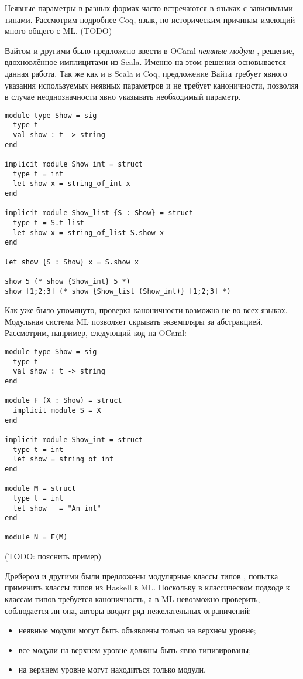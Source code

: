 \documentclass[../diploma.tex]{subfiles}
\begin{document}
Неявные параметры в разных формах часто встречаются в языках с зависимыми типами. Рассмотрим подробнее Coq, язык, по историческим причинам имеющий много общего с ML. (TODO)

Вайтом и другими было предложено ввести в OCaml \textit{неявные модули} \cite{white}, решение, вдохновлённое имплицитами из Scala. Именно на этом решении основывается данная работа. Так же как и в Scala и Coq, предложение Вайта требует явного указания используемых неявных параметров и не требует каноничности, позволяя в случае неоднозначности явно указывать необходимый параметр. 

\begin{verbatim}
module type Show = sig
  type t
  val show : t -> string
end

implicit module Show_int = struct
  type t = int
  let show x = string_of_int x
end

implicit module Show_list {S : Show} = struct
  type t = S.t list
  let show x = string_of_list S.show x
end

let show {S : Show} x = S.show x

show 5 (* show {Show_int} 5 *)
show [1;2;3] (* show {Show_list (Show_int)} [1;2;3] *)
\end{verbatim}

Как уже было упомянуто, проверка каноничности возможна не во всех языках. Модульная система ML позволяет скрывать экземпляры за абстракцией. Рассмотрим, например, следующий код на OCaml:

\begin{verbatim}
module type Show = sig
  type t
  val show : t -> string
end

module F (X : Show) = struct
  implicit module S = X
end

implicit module Show_int = struct
  type t = int
  let show = string_of_int
end

module M = struct
  type t = int
  let show _ = "An int"
end

module N = F(M)
\end{verbatim}

(TODO: пояснить пример)

Дрейером и другими были предложены модулярные классы типов \cite{ml_typeclasses}, попытка применить классы типов из Haskell в ML. Поскольку в классическом подходе к классам типов требуется каноничность, а в ML невозможно проверить, соблюдается ли она, авторы вводят ряд нежелательных ограничений:

\begin{itemize}
	\item неявные модули могут быть объявлены только на верхнем уровне;
	\item все модули на верхнем уровне должны быть явно типизированы;
	\item на верхнем уровне могут находиться только модули.
\end{itemize}
\end{document}
